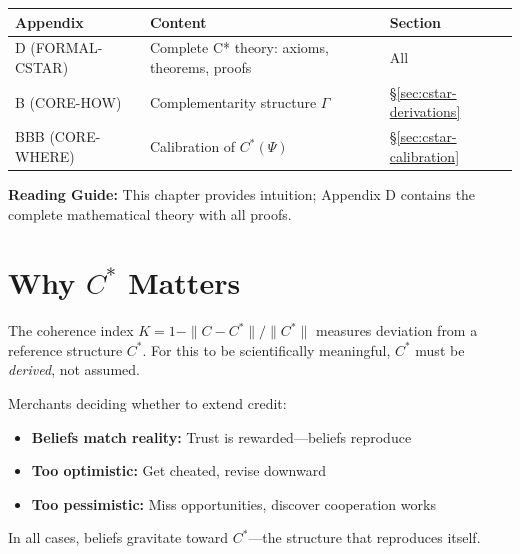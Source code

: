 \begin{tcolorbox}[
    colback=yellow!10!white,
    colframe=orange!75!black,
    title={\textbf{Appendix References for This Chapter}},
    fonttitle=\bfseries
]
\begin{tabular}{lll}
\textbf{Appendix} & \textbf{Content} & \textbf{Section} \\
\midrule
D (FORMAL-CSTAR) & Complete C* theory: axioms, theorems, proofs & All \\
B (CORE-HOW) & Complementarity structure $\Gamma$ & \S\ref{sec:cstar-derivations} \\
BBB (CORE-WHERE) & Calibration of $C^*(\Psi)$ & \S\ref{sec:cstar-calibration}
\end{tabular}

\medskip
\textbf{Reading Guide:} This chapter provides intuition; Appendix D contains
the complete mathematical theory with all proofs.
\end{tcolorbox}



\section{Why $C^*$ Matters}
\label{sec:cstar-intro}

The coherence index $K = 1 - \|C - C^*\|/\|C^*\|$ measures deviation from a
reference structure $C^*$. For this to be scientifically meaningful, $C^*$
must be \emph{derived}, not assumed.

\begin{intuition}
Merchants deciding whether to extend credit:
\begin{itemize}[nosep]
    \item \textbf{Beliefs match reality:} Trust is rewarded---beliefs reproduce
    \item \textbf{Too optimistic:} Get cheated, revise downward
    \item \textbf{Too pessimistic:} Miss opportunities, discover cooperation works
\end{itemize}
In all cases, beliefs gravitate toward $C^*$---the structure that reproduces itself.
\end{intuition}

